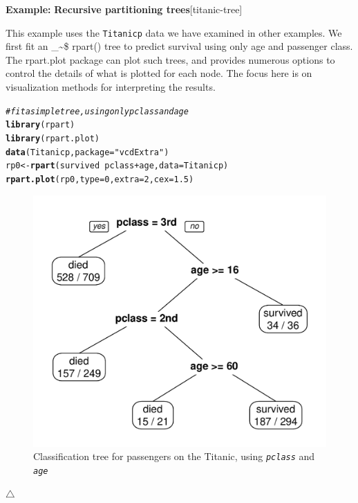\documentclass{article}
\makeatletter
\newcommand{\hlnum}[1]{\textcolor[rgb]{0.686,0.059,0.569}{#1}}%
\newcommand{\hlstr}[1]{\textcolor[rgb]{0.192,0.494,0.8}{#1}}%
\newcommand{\hlcom}[1]{\textcolor[rgb]{0.678,0.584,0.686}{\textit{#1}}}%
\newcommand{\hlopt}[1]{\textcolor[rgb]{0,0,0}{#1}}%
\newcommand{\hlstd}[1]{\textcolor[rgb]{0.345,0.345,0.345}{#1}}%
\newcommand{\hlkwb}[1]{\textcolor[rgb]{0.69,0.353,0.396}{#1}}%
\newcommand{\hlkwc}[1]{\textcolor[rgb]{0.333,0.667,0.333}{#1}}%
\newcommand{\hlkwd}[1]{\textcolor[rgb]{0.737,0.353,0.396}{\textbf{#1}}}%
\newenvironment{kframe}{%
 \def\at@end@of@kframe{}%
 \ifinner\ifhmode%
  \def\at@end@of@kframe{\end{minipage}}%
  \begin{minipage}{\columnwidth}%
 \fi\fi%
 \def\FrameCommand##1{\hskip\@totalleftmargin \hskip-\fboxsep
 \colorbox{shadecolor}{##1}\hskip-\fboxsep
     \hskip-\linewidth \hskip-\@totalleftmargin \hskip\columnwidth}%
 \MakeFramed {\advance\hsize-\width
   \@totalleftmargin\z@ \linewidth\hsize
   \@setminipage}}%
 {\par\unskip\endMakeFramed%
 \at@end@of@kframe}
\newenvironment{knitrout}{}{} %
\newcommand{\var}[1]{\textit{\texttt{#1}}}
\newcommand{\data}[1]{\texttt{#1}}
\newcommand\code{\bgroup\@makeother\_\@makeother\~\@makeother\$\@codex}
\def\@codex#1{{\normalfont\ttfamily\hyphenchar\font=-1 #1}\egroup}
\newcommand{\func}[1]{\code{#1()}}
\newcommand{\pkg}[1]{\textsf{#1}\nocite{R-#1}}
\newcommand{\Rpackage}[1]{\pkg{#1} package}
\newenvironment{Example}[2][unnamed-example]%
  {\medskip\noindent\textbf{\textsf{Example:}}
   \textbf{#2}\hfill [#1]\par\smallskip
  }
  {\hfill $\triangle$}
\makeatother
\begin{document}
\begin{Example}[titanic-tree]{Recursive partitioning trees}

This example uses the \data{Titanicp} data we have examined in other examples.
We first fit an \func{rpart} tree to predict survival using only age and passenger class.
The \Rpackage{rpart.plot} can plot such trees, and provides numerous options to 
control the details of what is plotted for each node.  
The focus here is on visualization methods for interpreting the results.

\begin{knitrout}
\color{fgcolor}\begin{kframe}
\begin{alltt}
\hlcom{# fit a simple tree, using only pclass and age}
\hlkwd{library}\hlstd{(rpart)}
\hlkwd{library}\hlstd{(rpart.plot)}
\hlkwd{data}\hlstd{(Titanicp,} \hlkwc{package}\hlstd{=}\hlstr{"vcdExtra"}\hlstd{)}
\hlstd{rp0} \hlkwb{<-} \hlkwd{rpart}\hlstd{(survived} \hlopt{~} \hlstd{pclass} \hlopt{+} \hlstd{age,} \hlkwc{data}\hlstd{=Titanicp)}
\hlkwd{rpart.plot}\hlstd{(rp0,} \hlkwc{type}\hlstd{=}\hlnum{0}\hlstd{,} \hlkwc{extra}\hlstd{=}\hlnum{2}\hlstd{,} \hlkwc{cex}\hlstd{=}\hlnum{1.5}\hlstd{)}
\end{alltt}
\end{kframe}\begin{figure}[hbt!]


{\centering \includegraphics[width=0.55\linewidth]{figure/rp0} 

}

\caption[Classification tree for passengers on the Titanic, using \var{pclass} and \var{age}]{Classification tree for passengers on the Titanic, using \var{pclass} and \var{age}\label{fig:rp0}}
\end{figure}


\end{knitrout}



\end{Example}
\end{document}
